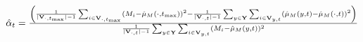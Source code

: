 
$\hat{\alpha}_t = {\left( {1\over \mid{\bold{V}_{\cdot,t_{\max}}}\mid-1}\sum_{i\in \bold{V}_{\cdot,t_{\max}}}(M_i-\hat{\mu}_M(\cdot,t_{\max}))^2  -{1\over \mid{\bold{V}_{\cdot,t}}\mid-1} \sum_{y\in \bold{Y}}\sum_{i \in \bold{V}_{y,t}}(\hat{\mu}_M(y,t) -\hat{\mu}_M(\cdot,t) )^2 \right)\over{1\over \mid{\bold{V}_{\cdot,t}}\mid-1} \sum_{y\in\bold{Y}} \sum_{i \in \bold{V}_{y,t}}(M_i-\hat{\mu}_M(y,t))^2}$
